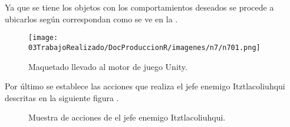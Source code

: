 Ya que se tiene los objetos con los comportamientos deseados se procede a ubicarlos según correspondan como se ve en la \cite{fig:n704}.
\begin{figure}
	\centering
	\caption{Maquetado llevado al motor de juego Unity.}
	\label{fig:n704}
	\texttt{[image: 03TrabajoRealizado/DocProduccionR/imagenes/n7/n701.png]}
\end{figure}

Por último se establece las acciones que realiza el jefe enemigo Itztlacoliuhqui descritas en la siguiente figura \cite{fig:n705}.
\begin{figure}[htbp]
	\centering
	\caption{Muestra de acciones de el jefe enemigo Itztlacoliuhqui. } \label{fig:n705}
\end{figure}

